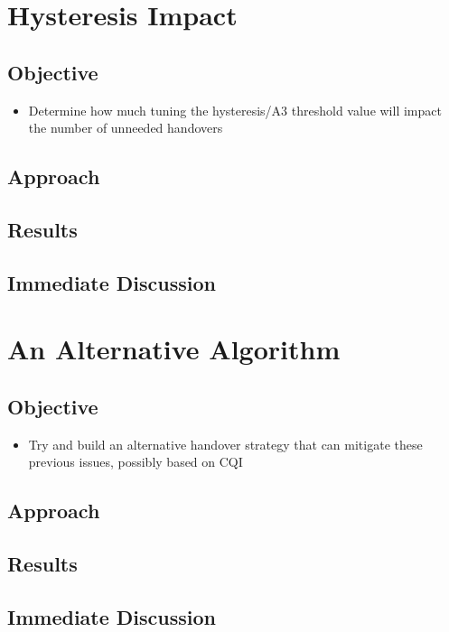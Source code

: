 \section{Hysteresis Impact}
\subsection{Objective}
\begin{itemize}
    \item Determine how much tuning the hysteresis/A3 threshold value will impact the number of unneeded handovers 
\end{itemize}
\subsection{Approach}
\subsection{Results}
\subsection{Immediate Discussion}

\section{An Alternative Algorithm}
\subsection{Objective}
\begin{itemize}
    \item Try and build an alternative handover strategy that can mitigate these previous issues, possibly based on CQI
\end{itemize}
\subsection{Approach}
\subsection{Results}
\subsection{Immediate Discussion}